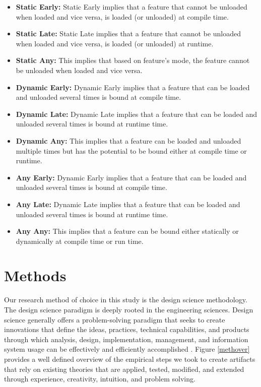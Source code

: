 \documentclass[conference]{IEEEtran}
\begin{document}
\begin{itemize}
    
    \item \textbf{Static Early: } Static Early implies that a feature that cannot be unloaded when loaded and vice versa, is loaded (or unloaded) at compile time. 
    
    \item \textbf{Static Late: } Static Late implies that a feature that cannot be unloaded when loaded and vice versa, is loaded (or unloaded) at runtime.
    
    \item \textbf{Static Any: } This implies that based on feature's mode, the feature cannot be unloaded when loaded and vice versa.  
    
    \item \textbf{Dynamic Early: }Dynamic Early implies that a feature that can be loaded and unloaded several times is bound at compile time.
    
    \item \textbf{Dynamic Late: }Dynamic Late implies that a feature that can be loaded and unloaded several times is bound at runtime time.
    
    \item \textbf{Dynamic Any: } This implies that a feature can be loaded and unloaded multiple times but has the potential to be bound either at compile time or runtime.
    
    \item \textbf{Any Early: }Dynamic Early implies that a feature that can be loaded and unloaded several times is bound at compile time.
    
    \item \textbf{Any Late: }Dynamic Late implies that a feature that can be loaded and unloaded several times is bound at runtime time.
    
    \item \textbf{Any Any: } This implies that a feature can be bound either statically or dynamically at compile time or run time. 
    
\end{itemize}

\section{Methods}
Our research method of choice in this study is the design science methodology. The design science paradigm is deeply rooted in the engineering sciences. Design science generally offers a problem-solving paradigm that seeks to create innovations that define the ideas, practices, technical capabilities, and products through which analysis, design, implementation, management, and information system usage can be effectively and efficiently accomplished  \cite{des-res}. Figure \ref{methover} provides a well defined overview of the empirical steps we took to create artifacts that rely on existing theories that are applied, tested, modified, and extended through experience, creativity, intuition, and problem solving. 
\end{document}
